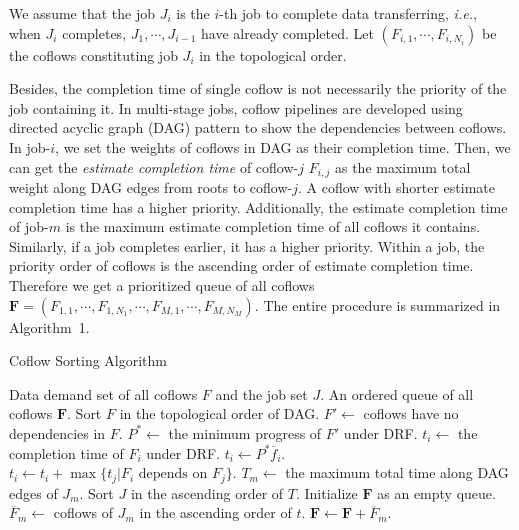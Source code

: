 \documentclass[10pt,journal,compsoc]{IEEEtran}
\begin{document}
We assume that the job $J_i$ is the $i$-th job to complete data transferring, \emph{i.e.}, when $J_i$ completes, $J_1,\cdots,J_{i-1}$ have already completed.
%
Let $(F_{i,1},\cdots,F_{i,N_i})$ be the coflows constituting job $J_i$ in the topological order.

Besides, the completion time of single coflow is not necessarily the priority of the job containing it.
%
In multi-stage jobs, coflow pipelines are developed using directed acyclic graph (DAG) pattern to show the dependencies between coflows.
%
In job-$i$, we set the weights of coflows in DAG as their completion time.
%
Then, we can get the \emph{estimate completion time} of coflow-$j$ $F_{i,j}$ as the maximum total weight along DAG edges from roots to coflow-$j$.
%
A coflow with shorter estimate completion time has a higher priority.
%
Additionally, the estimate completion time of job-$m$ is the maximum estimate completion time of all coflows it contains.
%
Similarly, if a job completes earlier, it has a higher priority.
%
Within a job, the priority order of coflows is the ascending order of estimate completion time.
%
Therefore we get a prioritized queue of all coflows $\mathbf{F} = (F_{1,1},\cdots,F_{1,N_1},\cdots,F_{M,1},\cdots,F_{M,N_M})$.
%
The entire procedure is summarized in Algorithm~1.

\begin{algorithm}
	\caption{Coflow Sorting Algorithm}
	\begin{algorithmic}[1]
		\Require Data demand set of all coflows $F$ and the job set $J$.
		\Ensure An ordered queue of all coflows $\mathbf{F}$.
		\State Sort $F$ in the topological order of DAG.
		\State $F' \gets $ coflows have no dependencies in $F$.
		\State $P^* \gets$ the minimum progress of $F'$ under DRF.
				\State $t_i \gets$ the completion time of $F_i$ under DRF.
			\Else
				\State $t_i \gets P^*\overline{f}_i$.
			\EndIf
				\State $t_i \gets t_i + \max{\{t_j|F_i \text{ depends on } F_j\}}$.
			\EndIf
		\EndFor
		\State $T_m \gets$ the maximum total time along DAG edges of $J_m$.
		\State Sort $J$ in the ascending order of $T$.
		\State Initialize $\mathbf{F}$ as an empty queue.
			\State $\overline{F}_m \gets$ coflows of $J_m$ in the ascending order of $t$.
			\State $\mathbf{F} \gets \mathbf{F} + \overline{F}_m$.
		\EndFor
	\end{algorithmic}
\end{algorithm}
\end{document}
